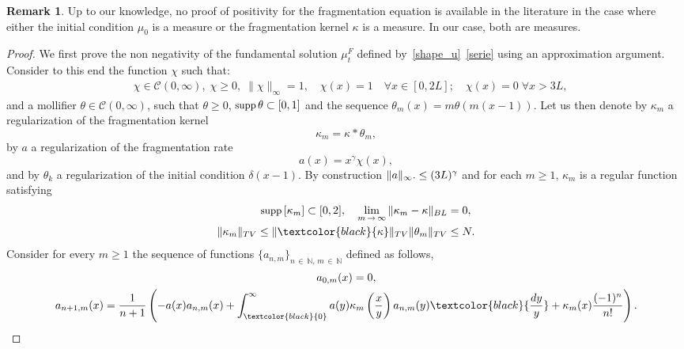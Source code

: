 \documentclass[10pt]{amsart}
\theoremstyle{definition}\newtheorem{defi}[theo]{Definition}\newtheorem{rema}[theo]{Remark}\newtheorem{exam}[theo]{Example}\newtheorem{exem}[theo]{Example}\newtheorem{nota}[theo]{Notation}
\newcommand*\dst{\displaystyle}
\newcommand*\N{\mathbb{N}}
\newcommand{\clC}{\mathcal{C}}
\newcommand{\MT}[1]{\textcolor{black}{#1}}
\newcommand*\supp{{\mbox{\small\rm supp}}\,}
\let\oldforall\forall
\renewcommand*{\forall}{\mathrel{\oldforall}}
\begin{document}
\begin{rema}
Up to our knowledge, no proof of positivity for the fragmentation equation is available in the literature in the case where either the initial condition $\mu_0$ is a measure or the fragmentation kernel $\kappa$ is a measure. In our case, both are measures.
\end{rema}


\begin{proof}
We first prove the non negativity of the fundamental solution $\mu_t^F$ defined by~\eqref{shape_u}~\eqref{serie} using an approximation argument. Consider to this end the function $\chi$ such that:
\begin{align*}
&\chi\in \clC(0, \infty),\;\chi\ge 0,\;\|\chi\|_\infty=1, \quad \chi(x)=1\quad\forall x\in [0, 2L];\quad
\chi(x)=0\;\forall x>3L,
\end{align*}
and a mollifier $\theta\in \clC(0, \infty)$, such that $\theta \ge 0$, $\supp \theta\subset [0, 1]$ and the sequence $\theta _m(x)=m\theta (m(x-1))$. Let us then denote by $\kappa_m$ a regularization of the fragmentation kernel
\begin{equation*}
\kappa _m=\kappa \ast \theta_m,
\end{equation*}
by $a$ a regularization of the fragmentation rate
\begin{equation*}
a(x)=x^{\gamma}\chi(x),
\end{equation*}
and by $\theta_k$ a regularization of the initial condition $\delta(x-1)$. By construction $\|a\|_\infty. \linebreak\le (3L)^\gamma$ and for each $m\ge 1$, $\kappa _m$ is a regular function satisfying
\begin{equation}
\label{kmBL2}
\begin{split}
\supp[\kappa_m]\subset [0, 2], \quad \lim_{m\,\to \,\infty}\|\kappa _m-\kappa\|_{BL} &=0, \\
\|\kappa _m\|_{TV}\le \|\MT{\kappa}\|_{TV}\|\theta_m\|_{TV} &\le N.
\end{split}
\end{equation}
Consider for every $m\ge 1$ the sequence of functions $\{a_{n, m}\}_{n\,\in\,\N,\,m\,\in\,\N}$ defined as follows,
\begin{multline}\label{inductionB}
 a_{0, m}(x) =0,\\
a_{n+1, m}(x) = \dfrac{1}{n+1}\left(-a(x)a_{n, m}(x)+ \dst\int_{\MT{0}}^{\infty} a(y) \kappa_m \left(\dfrac{x}{y} \right)a_{n, m}(y)\MT{\dfrac{dy}{y}} + \kappa_m(x) \dfrac{(-1)^n}{n!}\right).
\end{multline}

\end{proof}
\end{document}
